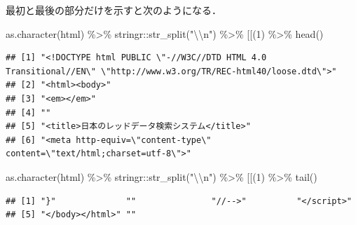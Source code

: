 \documentclass[
]{article}
\newenvironment{Shaded}{\begin{snugshade}}{\end{snugshade}}
\newcommand{\AttributeTok}[1]{\textcolor[rgb]{0.77,0.63,0.00}{#1}}
\newcommand{\DecValTok}[1]{\textcolor[rgb]{0.00,0.00,0.81}{#1}}
\newcommand{\FunctionTok}[1]{\textcolor[rgb]{0.00,0.00,0.00}{#1}}
\newcommand{\NormalTok}[1]{#1}
\newcommand{\SpecialCharTok}[1]{\textcolor[rgb]{0.00,0.00,0.00}{#1}}
\newcommand{\StringTok}[1]{\textcolor[rgb]{0.31,0.60,0.02}{#1}}
\begin{document}
最初と最後の部分だけを示すと次のようになる．

\begin{Shaded}
\begin{Highlighting}[]
\FunctionTok{as.character}\NormalTok{(html) }\SpecialCharTok{\%\textgreater{}\%}
\NormalTok{  stringr}\SpecialCharTok{::}\FunctionTok{str\_split}\NormalTok{(}\StringTok{"}\SpecialCharTok{\textbackslash{}\textbackslash{}}\StringTok{n"}\NormalTok{) }\SpecialCharTok{\%\textgreater{}\%}
  \StringTok{\textasciigrave{}}\AttributeTok{[[}\StringTok{\textasciigrave{}}\NormalTok{(}\DecValTok{1}\NormalTok{) }\SpecialCharTok{\%\textgreater{}\%}
  \FunctionTok{head}\NormalTok{()}
\end{Highlighting}
\end{Shaded}

\begin{verbatim}
## [1] "<!DOCTYPE html PUBLIC \"-//W3C//DTD HTML 4.0 Transitional//EN\" \"http://www.w3.org/TR/REC-html40/loose.dtd\">"
## [2] "<html><body>"                                                                                                  
## [3] "<em></em>"                                                                                                     
## [4] ""                                                                                                              
## [5] "<title>日本のレッドデータ検索システム</title>"                                                                 
## [6] "<meta http-equiv=\"content-type\" content=\"text/html;charset=utf-8\">"
\end{verbatim}

\begin{Shaded}
\begin{Highlighting}[]
\FunctionTok{as.character}\NormalTok{(html) }\SpecialCharTok{\%\textgreater{}\%}
\NormalTok{  stringr}\SpecialCharTok{::}\FunctionTok{str\_split}\NormalTok{(}\StringTok{"}\SpecialCharTok{\textbackslash{}\textbackslash{}}\StringTok{n"}\NormalTok{) }\SpecialCharTok{\%\textgreater{}\%}
  \StringTok{\textasciigrave{}}\AttributeTok{[[}\StringTok{\textasciigrave{}}\NormalTok{(}\DecValTok{1}\NormalTok{) }\SpecialCharTok{\%\textgreater{}\%}
  \FunctionTok{tail}\NormalTok{()}
\end{Highlighting}
\end{Shaded}

\begin{verbatim}
## [1] "}"              ""               "//-->"          "</script>"     
## [5] "</body></html>" ""
\end{verbatim}
\end{document}
